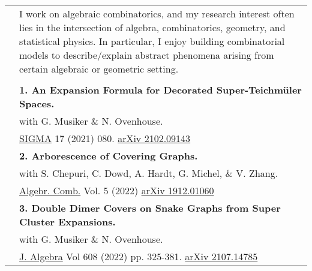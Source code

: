 \documentclass[letterpaper, 11pt,times]{article}
\newcommand{\mycolor}[0]{\color{RoyalBlue}}
\newlength{\myl}
\newcommand{\ind}[0]{\hspace{\myl}}
\newlength{\newl}
\newcommand{\paper}[2]{
\settowidth{\newl}{\textbf{#1. \ }}
\noindent
\hspace{\dimexpr\myl - \newl}
\textbf{#1. #2}
}
\begin{document}
\begin{longtable}{p{1in}p{5in}}

\nohyphens{\mycolor{Research}}
& I work on algebraic combinatorics, and my research interest often lies in the intersection of algebra, combinatorics, geometry, and statistical physics. In particular, I enjoy building combinatorial models to describe/explain abstract phenomena arising from certain algebraic or geometric setting.  
%	
%
%	
\\

& \\



\nohyphens{\mycolor{Publications}} 
&\paper{1}{An Expansion Formula for Decorated Super-Teichm\"uler Spaces.} \\
&\ind  with  G. Musiker \& N. Ovenhouse. \\
&\ind  \href{https://doi.org/10.3842/SIGMA.2021.080}{SIGMA} {17} (2021) 080. \href{https://arxiv.org/abs/2102.09143}{arXiv 2102.09143}\\

&\paper{2}{Arborescence of Covering Graphs.} \\
&\ind  with S. Chepuri, C. Dowd, A. Hardt, G. Michel, \& V. Zhang.\\
&\ind     \href{https://doi.org/10.5802/alco.212}{Algebr. Comb.} Vol. 5 (2022) \href{https://arxiv.org/abs/1912.01060}{arXiv 1912.01060}\\

&\paper{3}{Double Dimer Covers on Snake Graphs from Super Cluster Expansions.}\\
&\ind  with G. Musiker \& N. Ovenhouse.\\
&\ind  \href{https://doi.org/10.1016/j.jalgebra.2022.05.033}{J. Algebra} Vol 608 (2022) pp. 325-381. \href{https://arxiv.org/abs/2107.14785}{arXiv 2107.14785}\\


\end{longtable}
\end{document}
